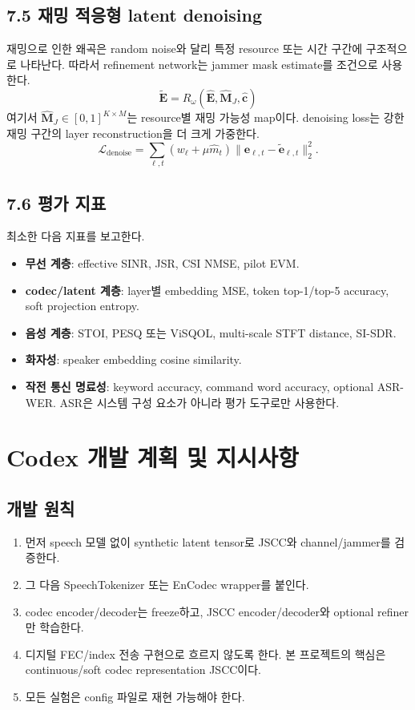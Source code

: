 \documentclass[11pt,a4paper]{article}
\begin{document}
\subsection{7.5 재밍 적응형 latent denoising}
재밍으로 인한 왜곡은 random noise와 달리 특정 resource 또는 시간 구간에 구조적으로 나타난다. 따라서 refinement network는 jammer mask estimate를 조건으로 사용한다.
\begin{equation}
    \tilde{\bm{E}}=R_{\omega}(\hat{\bm{E}},\hat{\bm{M}}_J,\hat{\bm{c}})
\end{equation}
여기서 $\hat{\bm{M}}_J\in[0,1]^{K\times M}$는 resource별 재밍 가능성 map이다. denoising loss는 강한 재밍 구간의 layer reconstruction을 더 크게 가중한다.
\begin{equation}
    \mathcal{L}_{\mathrm{denoise}}=\sum_{\ell,t}\left(w_{\ell}+\mu\hat{m}_{t}\right)\|\bm{e}_{\ell,t}-\tilde{\bm{e}}_{\ell,t}\|_2^2.
\end{equation}

\subsection{7.6 평가 지표}
최소한 다음 지표를 보고한다.
\begin{itemize}
    \item \textbf{무선 계층}: effective SINR, JSR, CSI NMSE, pilot EVM.
    \item \textbf{codec/latent 계층}: layer별 embedding MSE, token top-1/top-5 accuracy, soft projection entropy.
    \item \textbf{음성 계층}: STOI, PESQ 또는 ViSQOL, multi-scale STFT distance, SI-SDR.
    \item \textbf{화자성}: speaker embedding cosine similarity.
    \item \textbf{작전 통신 명료성}: keyword accuracy, command word accuracy, optional ASR-WER. ASR은 시스템 구성 요소가 아니라 평가 도구로만 사용한다.
\end{itemize}

\section{Codex 개발 계획 및 지시사항}

\subsection{개발 원칙}
\begin{enumerate}[label=\arabic*)]
    \item 먼저 speech 모델 없이 synthetic latent tensor로 JSCC와 channel/jammer를 검증한다.
    \item 그 다음 SpeechTokenizer 또는 EnCodec wrapper를 붙인다.
    \item codec encoder/decoder는 freeze하고, JSCC encoder/decoder와 optional refiner만 학습한다.
    \item 디지털 FEC/index 전송 구현으로 흐르지 않도록 한다. 본 프로젝트의 핵심은 continuous/soft codec representation JSCC이다.
    \item 모든 실험은 config 파일로 재현 가능해야 한다.
\end{enumerate}
\end{document}
